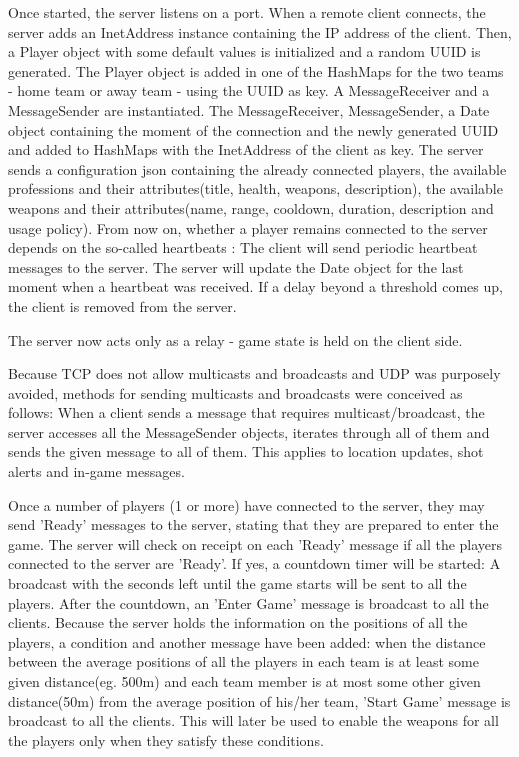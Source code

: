 Once started, the server listens on a port. When a remote client connects, the
server adds an InetAddress instance containing the IP address of the client.
Then, a Player object with some default values is initialized and a random UUID
is generated. The Player object is added in one of the HashMaps for the two
teams - home team or away team - using the UUID as key. A MessageReceiver and a
MessageSender are instantiated. The MessageReceiver, MessageSender, a Date
object containing the moment of the connection and the newly generated UUID and
added to HashMaps with the InetAddress of the client as key. The server sends a
configuration json containing the already connected players, the available
professions and their attributes(title, health, weapons, description), the
available weapons and their attributes(name, range, cooldown, duration,
description and usage policy). From now on, whether a player remains connected
to the server depends on the so-called heartbeats : The client will send
periodic heartbeat messages to the server. The server will update the Date
object for the last moment when a heartbeat was received. If a delay beyond a
threshold comes up, the client is removed from the server.\newline

The server now acts only as a relay - game state is held on the client
side.\newline

Because TCP does not allow multicasts and broadcasts and UDP was purposely
avoided, methods for sending multicasts and broadcasts were conceived as
follows: When a client sends a message that requires multicast/broadcast, the
server accesses all the MessageSender objects, iterates through all of them and
sends the given message to all of them. This applies to location updates, shot
alerts and in-game messages.\newline

Once a number of players (1 or more) have connected to the server, they may send
'Ready' messages to the server, stating that they are prepared to enter the
game. The server will check on receipt on each 'Ready' message if all the
players connected to the server are 'Ready'. If yes, a countdown timer will be
started: A broadcast with the seconds left until the game starts will be sent to
all the players. After the countdown, an 'Enter Game' message is broadcast to
all the clients. Because the server holds the information on the positions of
all the players, a condition and another message have been added: when the
distance between the average positions of all the players in each team is at
least some given distance(eg. 500m) and each team member is at most some other
given distance(50m) from the average position of his/her team, 'Start Game'
message is broadcast to all the clients. This will later be used to enable the
weapons for all the players only when they satisfy these conditions.\newline

